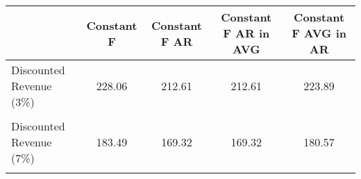 \begin{tabular}{l*{4}{c}}
\hline\hline
                &Constant F&Constant F AR&Constant F AR in AVG&Constant F AVG in AR\\
\hline
Discounted Revenue (3\%)&   228.06&   212.61&   212.61&   223.89\\
                &         &         &         &         \\
Discounted Revenue (7\%)&   183.49&   169.32&   169.32&   180.57\\
                &         &         &         &         \\
\hline\hline
\end{tabular}

